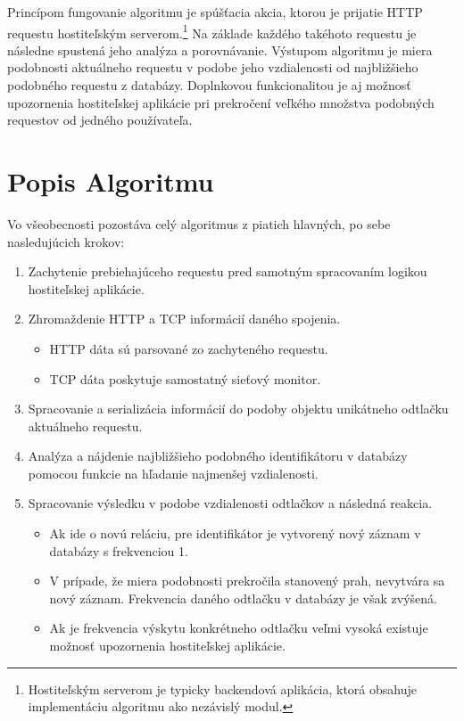 \documentclass[
  digital, %
  table,   %
  lof,     %
  nolot,   %
  nocover
]{fithesis3}
\begin{document}
Princípom fungovanie algoritmu je spúšťacia akcia, ktorou je prijatie HTTP requestu
hostiteľským serverom.\footnote{Hostiteľským serverom je typicky backendová
aplikácia, ktorá obsahuje implementáciu algoritmu ako nezávislý modul.} Na
základe každého takéhoto requestu je následne spustená jeho analýza a
porovnávanie. Výstupom algoritmu je miera podobnosti aktuálneho
requestu v podobe jeho vzdialenosti od najbližšieho podobného requestu
z databázy. Doplnkovou funkcionalitou je aj možnosť upozornenia hostiteľskej
aplikácie pri prekročení veľkého množstva podobných requestov od jedného používateľa.

\section{Popis Algoritmu}
Vo všeobecnosti pozostáva celý algoritmus z piatich hlavných, po sebe nasledujúcich krokov:
\begin{enumerate}
  \item Zachytenie prebiehajúceho requestu pred samotným spracovaním logikou hostiteľskej aplikácie.
  \item Zhromaždenie HTTP a TCP informácií daného spojenia.
  \begin{itemize}
    \item HTTP dáta sú parsované zo zachyteného requestu.
    \item TCP dáta poskytuje samostatný sieťový monitor.
  \end{itemize}
  \item Spracovanie a serializácia informácií do podoby objektu unikátneho odtlačku
  aktuálneho requestu.
  \item Analýza a nájdenie najbližšieho podobného identifikátoru v databázy pomocou funkcie na
  hľadanie najmenšej vzdialenosti.
  \item Spracovanie výsledku v podobe vzdialenosti odtlačkov a následná reakcia.
  \begin{itemize}
    \item Ak ide o novú reláciu, pre identifikátor je vytvorený nový záznam v databázy s frekvenciou 1.
    \item V prípade, že miera podobnosti prekročila stanovený prah, nevytvára
    sa nový záznam. Frekvencia daného odtlačku v databázy je však zvýšená.
    \item Ak je frekvencia výskytu konkrétneho odtlačku veľmi vysoká existuje
    možnosť upozornenia hostiteľskej aplikácie.
  \end{itemize}
\end{enumerate}
\end{document}
